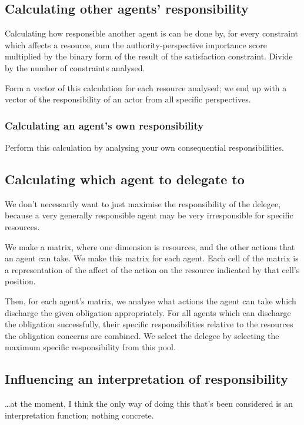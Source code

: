 \documentclass{article}
\begin{document}
\subsection{Calculating other agents' responsibility}

Calculating how responsible another agent is can be done by, for every constraint which affects a resource, sum the authority-perspective importance score multiplied by the binary form of the result of the satisfaction constraint. Divide by the number of constraints analysed.\par

Form a vector of this calculation for each resource analysed; we end up with a vector of the responsibility of an actor from all specific perspectives.\par

\subsubsection{Calculating an agent's own responsibility}

Perform this calculation by analysing your own consequential responsibilities.\par

\subsection{Calculating which agent to delegate to}

We don't necessarily want to just maximise the responsibility of the delegee, because a very generally responsible agent may be very irresponsible for specific resources. \par

We make a matrix, where one dimension is resources, and the other actions that an agent can take. We make this matrix for each agent. Each cell of the matrix is a representation of the affect of the action on the resource indicated by that cell's position.\par

Then, for each agent's matrix, we analyse what actions the agent can take which discharge the given obligation appropriately. For all agents which can discharge the obligation successfully, their specific responsibilities relative to the resources the obligation concerns are combined. We select the delegee by selecting the maximum specific responsibility from this pool.\par

\subsection{Influencing an interpretation of responsibility}

\ldots{}at the moment, I think the only way of doing this that's been considered is an interpretation function; nothing concrete.\par
\end{document}

